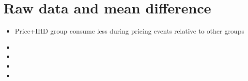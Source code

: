 \documentclass[12pt]{article}
\begin{document}
\section{Raw data and mean difference}
\begin{itemize}
    \item Price+IHD group consume less during pricing events relative to other groups
    \item {}
    \item {}
    \item {}
    \item {}

\end{itemize}
\end{document}
